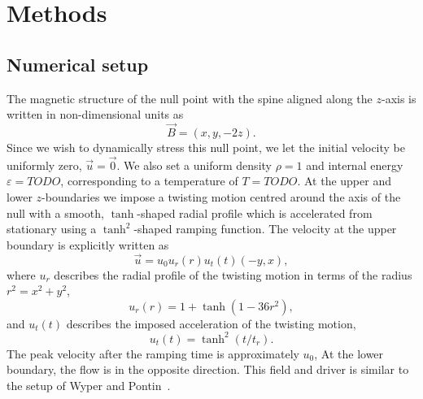\section{Methods}

\subsection{Numerical setup}

The magnetic structure of the null point with the spine aligned along the $z$-axis is written in non-dimensional units as
\begin{equation}
  \label{eq:null_point_field}
  \vec{B} = (x, y, -2z).
\end{equation}
Since we wish to dynamically stress this null point, we let the initial velocity be uniformly zero, $\vec{u} = \vec{0}$. We also set a uniform density $\rho = 1$ and internal energy $\varepsilon = TODO$, corresponding to a temperature of $T = TODO$. At the upper and lower $z$-boundaries we impose a twisting motion centred around the axis of the null with a smooth, $\tanh$-shaped radial profile which is accelerated from stationary using a $\tanh^2$-shaped ramping function. The velocity at the upper boundary is explicitly written as
\begin{equation}
  \label{eq:null_twisting_profile}
  \vec{u} = u_0 u_r(r) u_t(t) (-y, x),
\end{equation}
where $u_r$ describes the radial profile of the twisting motion in terms of the radius $r^2 = x^2 + y^2$,
\begin{equation}
  \label{eq:radial_twisting_function}
  u_r(r) = 1 + \tanh(1 - 36r^2),
\end{equation}
and $u_t(t)$ describes the imposed acceleration of the twisting motion,
\begin{equation}
  \label{eq:ramping_up_function}
  u_t(t) = \tanh^2(t/t_r).
\end{equation}
The peak velocity after the ramping time is approximately $u_0$, At the lower boundary, the flow is in the opposite direction. This field and driver is similar to the setup of Wyper and Pontin~\cite{wyperKelvinHelmholtzInstabilityCurrentvortex2013}. 


